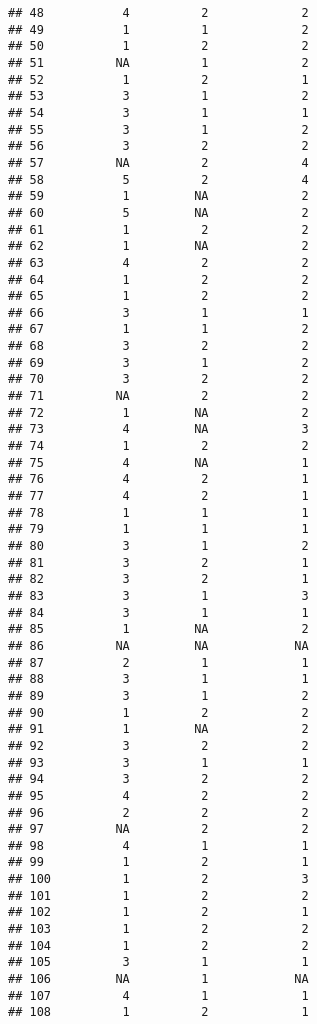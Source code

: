 \documentclass[
]{article}
\begin{document}
\begin{verbatim}
## 48           4          2             2
## 49           1          1             2
## 50           1          2             2
## 51          NA          1             2
## 52           1          2             1
## 53           3          1             2
## 54           3          1             1
## 55           3          1             2
## 56           3          2             2
## 57          NA          2             4
## 58           5          2             4
## 59           1         NA             2
## 60           5         NA             2
## 61           1          2             2
## 62           1         NA             2
## 63           4          2             2
## 64           1          2             2
## 65           1          2             2
## 66           3          1             1
## 67           1          1             2
## 68           3          2             2
## 69           3          1             2
## 70           3          2             2
## 71          NA          2             2
## 72           1         NA             2
## 73           4         NA             3
## 74           1          2             2
## 75           4         NA             1
## 76           4          2             1
## 77           4          2             1
## 78           1          1             1
## 79           1          1             1
## 80           3          1             2
## 81           3          2             1
## 82           3          2             1
## 83           3          1             3
## 84           3          1             1
## 85           1         NA             2
## 86          NA         NA            NA
## 87           2          1             1
## 88           3          1             1
## 89           3          1             2
## 90           1          2             2
## 91           1         NA             2
## 92           3          2             2
## 93           3          1             1
## 94           3          2             2
## 95           4          2             2
## 96           2          2             2
## 97          NA          2             2
## 98           4          1             1
## 99           1          2             1
## 100          1          2             3
## 101          1          2             2
## 102          1          2             1
## 103          1          2             2
## 104          1          2             2
## 105          3          1             1
## 106         NA          1            NA
## 107          4          1             1
## 108          1          2             1

\end{verbatim}
\end{document}
